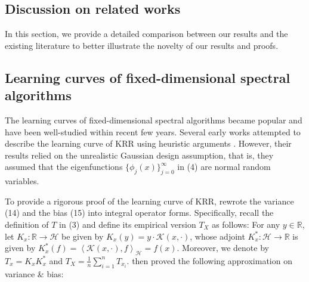 \documentclass{article}
\theoremstyle{plain}
\theoremstyle{definition}
\theoremstyle{remark}
\newcommand{\calH}{\mathcal{H}}
\newcommand{\R}{\mathbb{R}}
\providecommand{\ang}[1]{\left\langle{#1}\right\rangle}
\newcommand{\green}{\color{green}}
\begin{document}
\begin{appendix}
\section{Discussion on related works}\label{sec_related_work}

In this section, we provide a detailed comparison between our results and the existing literature to better illustrate the novelty of our results and proofs.

\subsection{Learning curves of fixed-dimensional spectral algorithms}\label{subsec_learning_curve_fix_d}

The learning curves of fixed-dimensional spectral algorithms became popular and have been well-studied within recent few years.
Several early works attempted to describe the learning curve of KRR using heuristic arguments \cite{Bordelon_Spectrum_2020, Cui2021GeneralizationER, mallinar2022benign}. However, their results relied on the unrealistic Gaussian design assumption, that is, they assumed that the eigenfunctions $\{\phi_j(x)\}_{j=0}^{\infty}$ in (4) are normal random variables.


To provide a rigorous proof of the learning curve of KRR, \cite{li2023asymptotic} rewrote the variance (14) and the bias (15) into integral operator forms. Specifically, recall the definition of $T$ in (3) and define its empirical version $T_{X}$ as follows: For any $y \in \mathbb{R}$, let $K_{x} : \R \to \calH$ be given by $K_{x}(y) = y \cdot \mathscr{K}(x,\cdot)$, whose adjoint $K_{x}^* : \calH \to \R$ is given by $K_{x}^*(f) = \ang{\mathscr{K}(x,\cdot),f}_{\calH} = f(x)$.
Moreover, we denote by $T_{x} = K_{x} K_{x}^*$ and $T_{X} = \frac{1}{n}\sum_{i=1}^n T_{x_i}$.
\cite{li2023asymptotic} then proved the following approximation on variance \& bias:


\end{appendix}
\end{document}
